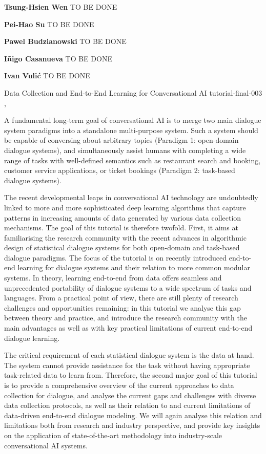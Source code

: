 \begin{bio}
\textbf{Tsung-Hsien Wen} TO BE DONE

\textbf{Pei-Hao Su} TO BE DONE

\textbf{Pawel Budzianowski} TO BE DONE

\textbf{I\~nigo Casanueva} TO BE DONE

\textbf{Ivan Vuli\'c} TO BE DONE

\end{bio}

\begin{tutorial}
  {Data Collection and End-to-End Learning for Conversational AI}
  {tutorial-final-003}
  {\daydateyear, \tutorialafternoontime}
  {\TutLocC}

A fundamental long-term goal of conversational AI is to merge two main dialogue system paradigms into a standalone multi-purpose system. Such a system should be capable of conversing about arbitrary topics (Paradigm 1: open-domain dialogue systems), and simultaneously assist humans with completing a wide range of tasks with well-defined semantics such as restaurant search and booking, customer service applications, or ticket bookings (Paradigm 2: task-based dialogue systems).

The recent developmental leaps in conversational AI technology are undoubtedly linked to more and more sophisticated deep learning algorithms that capture patterns in increasing amounts of data generated by various data collection mechanisms. The goal of this tutorial is therefore twofold. First, it aims at familiarising the research community with the recent advances in algorithmic design of statistical dialogue systems for both open-domain and task-based dialogue paradigms. The focus of the tutorial is on recently introduced end-to-end learning for dialogue systems and their relation to more common modular systems. In theory, learning end-to-end from data offers seamless and unprecedented portability of dialogue systems to a wide spectrum of tasks and languages. From a practical point of view, there are still plenty of research challenges and opportunities remaining: in this tutorial we analyse this gap between theory and practice, and introduce the research community with the main advantages as well as with key practical limitations of current end-to-end dialogue learning.

The critical requirement of each statistical dialogue system is the data at hand. The system cannot provide assistance for the task without having appropriate task-related data to learn from. Therefore, the second major goal of this tutorial is to provide a comprehensive overview of the current approaches to data collection for dialogue, and analyse the current gaps and challenges with diverse data collection protocols, as well as their relation to and current limitations of data-driven end-to-end dialogue modeling. We will again analyse this relation and limitations both from research and industry perspective, and provide key insights on the application of state-of-the-art methodology into industry-scale conversational AI systems.

\end{tutorial}

